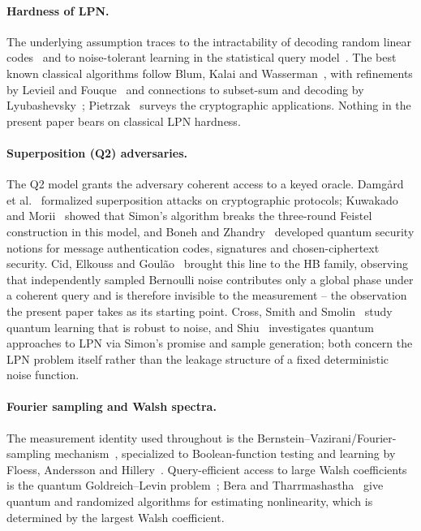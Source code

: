 \documentclass[10pt,twocolumn]{article}
\theoremstyle{definition}
\begin{document}
\paragraph{Hardness of LPN.} The underlying assumption traces to the
intractability of decoding random linear codes~\cite{berlekamp1978} and to
noise-tolerant learning in the statistical query model~\cite{kearns1998}. The
best known classical algorithms follow Blum, Kalai and
Wasserman~\cite{blum2003}, with refinements by Levieil and
Fouque~\cite{levieil2006} and connections to subset-sum and decoding by
Lyubashevsky~\cite{lyubashevsky2005}; Pietrzak~\cite{pietrzak2012} surveys the
cryptographic applications. Nothing in the present paper bears on classical
LPN hardness.

\paragraph{Superposition (Q2) adversaries.} The Q2 model grants the adversary
coherent access to a keyed oracle. Damg\aa rd et al.~\cite{damgard2011} formalized
superposition attacks on cryptographic protocols; Kuwakado and
Morii~\cite{kuwakado2010} showed that Simon's algorithm breaks the three-round
Feistel construction in this model, and Boneh and
Zhandry~\cite{boneh2013mac,boneh2013sig} developed quantum security notions for
message authentication codes, signatures and chosen-ciphertext security. Cid,
Elkouss and Goul\~ao~\cite{cid2026} brought this line to the HB family,
observing that independently sampled Bernoulli noise contributes only a global
phase under a coherent query and is therefore invisible to the measurement --
the observation the present paper takes as its starting point. Cross, Smith and
Smolin~\cite{cross2015} study quantum learning that is robust to noise, and
Shiu~\cite{shiu2026} investigates quantum approaches to LPN via Simon's promise
and sample generation; both concern the LPN problem itself rather than the
leakage structure of a fixed deterministic noise function.

\paragraph{Fourier sampling and Walsh spectra.} The measurement identity used
throughout is the Bernstein--Vazirani/Fourier-sampling
mechanism~\cite{bernstein1997,simon1997}, specialized to Boolean-function
testing and learning by Floess, Andersson and
Hillery~\cite{floess2013,hillery2011}. Query-efficient access to large Walsh
coefficients is the quantum Goldreich--Levin
problem~\cite{goldreich1989,adcock2002,li2020}; Bera and
Tharrmashastha~\cite{bera2021} give quantum and randomized algorithms for
estimating nonlinearity, which is determined by the largest Walsh coefficient.
\end{document}
